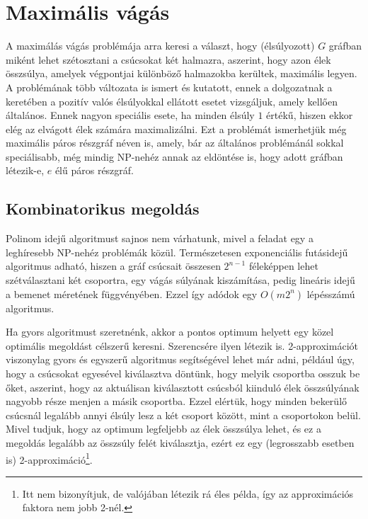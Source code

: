 \section{Maximális vágás}

A maximálás vágás problémája arra keresi a választ, hogy (élsúlyozott) $G$ gráfban miként lehet szétosztani a csúcsokat két halmazra, aszerint, hogy azon élek összsúlya, amelyek végpontjai különböző halmazokba kerültek, maximális legyen. A problémának több változata is ismert és kutatott, ennek a dolgozatnak a keretében a pozitív valós élsúlyokkal ellátott esetet vizsgáljuk, amely kellően általános. Ennek nagyon speciális esete, ha minden élsúly $1$ értékű, hiszen ekkor elég az elvágott élek számára maximalizálni. Ezt a problémát ismerhetjük még maximális páros részgráf néven is, amely, bár az általános problémánál sokkal speciálisabb, még mindig NP-nehéz annak az eldöntése is, hogy adott gráfban létezik-e, $e$ élű páros részgráf.

\subsection{Kombinatorikus megoldás}

Polinom idejű algoritmust sajnos nem várhatunk, mivel a feladat egy a leghíresebb NP-nehéz problémák közül. Természetesen exponenciális futásidejű algoritmus adható, hiszen a gráf csúcsait összesen $2^{n-1}$ féleképpen lehet szétválasztani két csoportra, egy vágás súlyának kiszámítása, pedig lineáris idejű a bemenet méretének függvényében. Ezzel így adódok egy $O(m 2^n)$ lépésszámú algoritmus.

Ha gyors algoritmust szeretnénk, akkor a pontos optimum helyett egy közel optimális megoldást célszerű keresni. Szerencsére ilyen létezik is. 2-approximációt viszonylag gyors és egyszerű algoritmus segítségével lehet már adni, például úgy, hogy a csúcsokat egyesével kiválasztva döntünk, hogy melyik csoportba osszuk be őket, aszerint, hogy az aktuálisan kiválasztott csúcsból kiinduló élek összsúlyának nagyobb része menjen a másik csoportba. Ezzel elértük, hogy minden bekerülő csúcsnál legalább annyi élsúly lesz a két csoport között, mint a csoportokon belül. Mivel tudjuk, hogy az optimum legfeljebb az élek összsúlya lehet, és ez a megoldás legalább az összsúly felét kiválasztja, ezért ez egy (legrosszabb esetben is) 2-approximáció\footnote{Itt nem bizonyítjuk, de valójában létezik rá éles példa, így az approximációs faktora nem jobb 2-nél.}.

